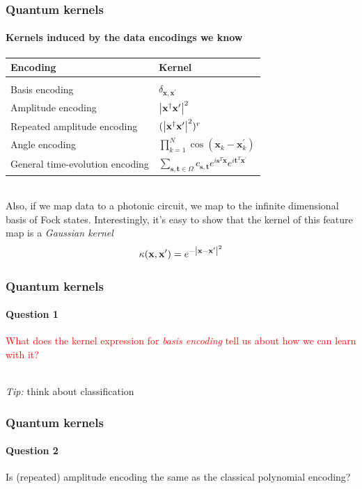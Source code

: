 \documentclass[aspectratio=43]{beamer}
\begin{document}
\begin{frame}
  \frametitle{Quantum kernels}
  \framesubtitle{Kernels induced by the data encodings we know}

  \begin{table}[htbp]
    \centering\begin{tabular}{ll}
      Encoding & Kernel \\
      \hline \\
      Basis encoding & $\delta_{\mathbf{x},\mathbf{x}^\prime}$\\
      Amplitude encoding & $\abs{\mathbf{x}^\dagger \mathbf{x}^\prime}^2$\\
      Repeated amplitude encoding & $(\abs{\mathbf{x}^\dagger \mathbf{x}^\prime}^2)^r$\\
      Angle encoding & $\prod_{k=1}^N\cos(\mathbf{x}_k-\mathbf{x}_k^\prime)$\\
      General time-evolution encoding & $\sum_{\mathbf{s},\mathbf{t}\in\Omega}c_{\mathbf{s},\mathbf{t}}e^{i\mathbf{s}^T\mathbf{x}}e^{i\mathbf{t}^T\mathbf{x^\prime}}$\\
      \hline
    \end{tabular}
  \end{table}

  \ \\
  \pause
  \footnotesize
  Also, if we map data to a photonic circuit, we map to the infinite dimensional basis of Fock states. Interestingly, it's easy to show that the kernel of this feature map is a \emph{Gaussian kernel}
  \[\kappa(\mathbf{x}, \mathbf{x}^\prime)=e^{-\abs{\mathbf{x}-\mathbf{x}^\prime}^2}\]

\end{frame}


\begin{frame}
  \frametitle{Quantum kernels}
  \framesubtitle{Question 1}

  \centering
  \textcolor{red}{What does the kernel expression for \emph{basis encoding} tell us about how we can learn with it?}
  
  \ \\
  \emph{Tip:} think about classification

\end{frame}


\begin{frame}
  \frametitle{Quantum kernels}
  \framesubtitle{Question 2}

  \centering
  \color{red} Is (repeated) amplitude encoding the same as the classical polynomial encoding?

\end{frame}
\end{document}
